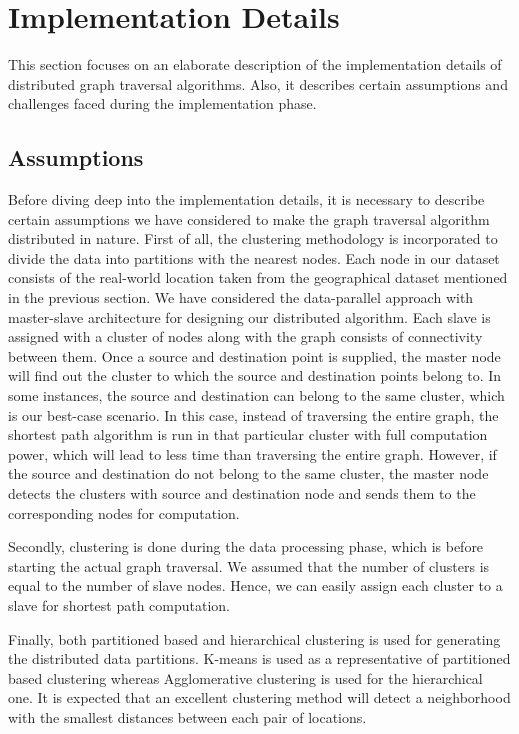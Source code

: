 \section{Implementation Details}
\label{sec:Implementation Details}
This section focuses on an elaborate description of the implementation details of distributed graph traversal algorithms. Also, it describes certain assumptions and challenges faced during the implementation phase.

\subsection{Assumptions}
Before diving deep into the implementation details, it is necessary to describe certain assumptions we have considered to make the graph traversal algorithm distributed in nature.
First of all, the clustering methodology is incorporated to divide the data into partitions with the nearest nodes. Each node in our dataset consists of the real-world location taken from the geographical dataset mentioned in the previous section. We have considered the data-parallel approach with master-slave architecture for designing our distributed algorithm. Each slave is assigned with a cluster of nodes along with the graph consists of connectivity between them. Once a source and destination point is supplied, the master node will find out the cluster to which the source and destination points belong to. In some instances, the source and destination can belong to the same cluster, which is our best-case scenario. In this case, instead of traversing the entire graph, the shortest path algorithm is run in that particular cluster with full computation power, which will lead to less time than traversing the entire graph.  However, if the source and destination do not belong to the same cluster, the master node detects the clusters with source and destination node and sends them to the corresponding nodes for computation.

Secondly, clustering is done during the data processing phase, which is before starting the actual graph traversal. We assumed that the number of clusters is equal to the number of slave nodes. Hence, we can easily assign each cluster to a slave for shortest path computation.

Finally, both partitioned based and hierarchical clustering is used for generating the distributed data partitions. K-means is used as a representative of partitioned based clustering whereas Agglomerative clustering is used for the hierarchical one. It is expected that an excellent clustering method will detect a neighborhood with the smallest distances between each pair of locations.

